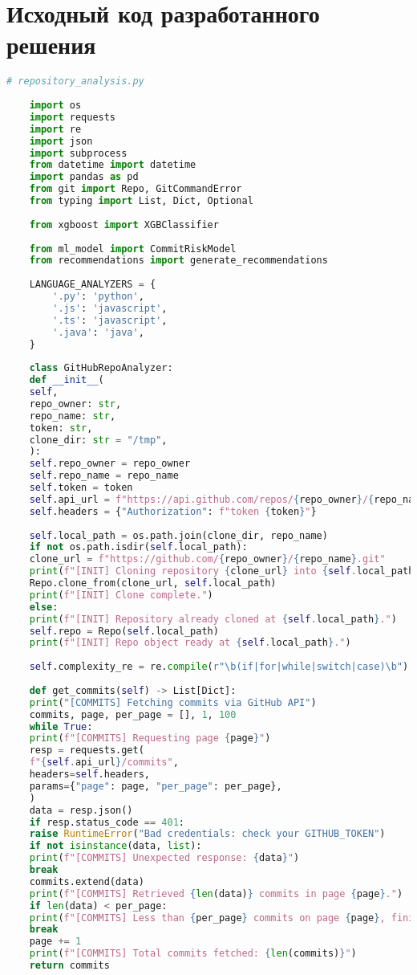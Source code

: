 \chapter{Исходный код разработанного решения}\label{appendix-MikTeX-TexStudio}              %

\begin{lstlisting}[language=Python, caption={{ \texttt{repository\_analysis.py}}}]
	# repository_analysis.py
	
	import os
	import requests
	import re
	import json
	import subprocess
	from datetime import datetime
	import pandas as pd
	from git import Repo, GitCommandError
	from typing import List, Dict, Optional
	
	from xgboost import XGBClassifier
	
	from ml_model import CommitRiskModel
	from recommendations import generate_recommendations
	
	LANGUAGE_ANALYZERS = {
		'.py': 'python',
		'.js': 'javascript',
		'.ts': 'javascript',
		'.java': 'java',
	}
	
	class GitHubRepoAnalyzer:
	def __init__(
	self,
	repo_owner: str,
	repo_name: str,
	token: str,
	clone_dir: str = "/tmp",
	):
	self.repo_owner = repo_owner
	self.repo_name = repo_name
	self.token = token
	self.api_url = f"https://api.github.com/repos/{repo_owner}/{repo_name}"
	self.headers = {"Authorization": f"token {token}"}
	
	self.local_path = os.path.join(clone_dir, repo_name)
	if not os.path.isdir(self.local_path):
	clone_url = f"https://github.com/{repo_owner}/{repo_name}.git"
	print(f"[INIT] Cloning repository {clone_url} into {self.local_path}")
	Repo.clone_from(clone_url, self.local_path)
	print(f"[INIT] Clone complete.")
	else:
	print(f"[INIT] Repository already cloned at {self.local_path}.")
	self.repo = Repo(self.local_path)
	print(f"[INIT] Repo object ready at {self.local_path}.")
	
	self.complexity_re = re.compile(r"\b(if|for|while|switch|case)\b")
	
	def get_commits(self) -> List[Dict]:
	print("[COMMITS] Fetching commits via GitHub API")
	commits, page, per_page = [], 1, 100
	while True:
	print(f"[COMMITS] Requesting page {page}")
	resp = requests.get(
	f"{self.api_url}/commits",
	headers=self.headers,
	params={"page": page, "per_page": per_page},
	)
	data = resp.json()
	if resp.status_code == 401:
	raise RuntimeError("Bad credentials: check your GITHUB_TOKEN")
	if not isinstance(data, list):
	print(f"[COMMITS] Unexpected response: {data}")
	break
	commits.extend(data)
	print(f"[COMMITS] Retrieved {len(data)} commits in page {page}.")
	if len(data) < per_page:
	print(f"[COMMITS] Less than {per_page} commits on page {page}, finishing.")
	break
	page += 1
	print(f"[COMMITS] Total commits fetched: {len(commits)}")
	return commits
	

\end{lstlisting}

